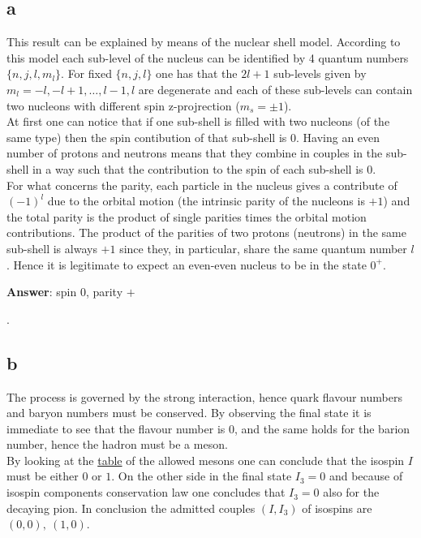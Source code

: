 \subsection*{a}
This result can be explained by means of the nuclear shell model. According to this model each sub-level of the nucleus can be identified by 4 quantum numbers $\{n, j, l, m_l\}$. For fixed $\{n, j, l\}$ 
one has that the $2l+1$ sub-levels given by $m_l = -l, -l+1, \dots, l-1, l$ are degenerate and each of these sub-levels can contain two nucleons with different spin z-projrection ($m_s = \pm 1$). \\
At first one can notice that if one sub-shell is filled with two nucleons (of the same type) then the spin contibution of that sub-shell is 0. Having an even number of protons and neutrons means that 
they combine in couples in the sub-shell in a way such that the contribution to the spin of each sub-shell is 0. \\
For what concerns the parity, each particle in the nucleus gives a contribute of $(-1)^l$ due to the orbital motion (the intrinsic parity of the nucleons is $+1$) and the total parity is the product of single parities times the orbital motion contributions. 
The product of the parities of two protons (neutrons) in the same sub-shell is always $+1$ since they, in particular, share the same quantum number $l$. Hence it is legitimate to expect an even-even nucleus
to be in the state $0^+$.
\vspace{10pt} \\
\centerline{\textbf{Answer}: spin $0$, parity $+$}.

\subsection*{b}
The process is governed by the strong interaction, hence quark flavour numbers and baryon numbers must be conserved.
By observing the final state it is immediate to see that the flavour number is 0, and the same holds for the barion number, hence the
hadron must be a meson. \\
By looking at the \href{https://en.wikipedia.org/wiki/Meson#List}{table} of the allowed mesons one can conclude that the isospin $I$ must be either $0$ or $1$. 
On the other side in the final state $I_3=0$ and because of isospin components conservation law one concludes that $I_3=0$ also for the decaying pion.
In conclusion the admitted couples $(I, I_3)$ of isospins are $(0, 0), \ (1, 0)$.


